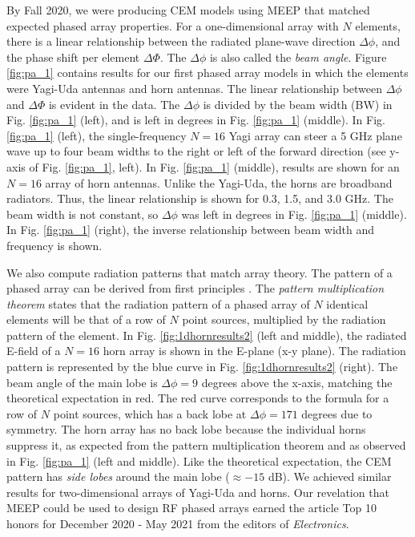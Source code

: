 \documentclass[11pt]{amsart}
\begin{document}
By Fall 2020, we were producing CEM models using MEEP that matched expected phased array properties.  For a one-dimensional array with $N$ elements, there is a linear relationship between the radiated plane-wave direction $\Delta \phi$, and the phase shift per element $\Delta \Phi$.  The $\Delta \phi$ is also called the \textit{beam angle}.  Figure \ref{fig:pa_1} contains results for our first phased array models in which the elements were Yagi-Uda antennas and horn antennas.  The linear relationship between $\Delta \phi$ and $\Delta \Phi$ is evident in the data.  The $\Delta \phi$ is divided by the beam width (BW) in Fig. \ref{fig:pa_1} (left), and is left in degrees in Fig. \ref{fig:pa_1} (middle).  In Fig. \ref{fig:pa_1} (left), the single-frequency $N=16$ Yagi array can steer a 5 GHz plane wave up to four beam widths to the right or left of the forward direction (see y-axis of Fig. \ref{fig:pa_1}, left).  In Fig. \ref{fig:pa_1} (middle), results are shown for an $N=16$ array of horn antennas.  Unlike the Yagi-Uda, the horns are broadband radiators.  Thus, the linear relationship is shown for 0.3, 1.5, and 3.0 GHz.  The beam width is not constant, so $\Delta \phi$ was left in degrees in Fig. \ref{fig:pa_1} (middle).  In Fig. \ref{fig:pa_1} (right), the inverse relationship between beam width and frequency is shown. 

We also compute radiation patterns that match array theory.  The pattern of a phased array can be derived from first principles \cite{electronics10040415}.  The \textit{pattern multiplication theorem} states that the radiation pattern of a phased array of $N$ identical elements will be that of a row of $N$ point sources, multiplied by the radiation pattern of the element.  In Fig. \ref{fig:1dhornresults2} (left and middle), the radiated E-field of a $N=16$ horn array is shown in the E-plane (x-y plane).  The radiation pattern is represented by the blue curve in Fig. \ref{fig:1dhornresults2} (right).  The beam angle of the main lobe is $\Delta \phi = 9$ degrees above the x-axis, matching the theoretical expectation in red.  The red curve corresponds to the formula for a row of $N$ point sources, which has a back lobe at $\Delta \phi = 171$ degrees due to symmetry.  The horn array has no back lobe because the individual horns suppress it, as expected from the pattern multiplication theorem and as observed in Fig. \ref{fig:pa_1} (left and middle).  Like the theoretical expectation, the CEM pattern has \textit{side lobes} around the main lobe ($\approx -15$ dB).  We achieved similar results for two-dimensional arrays of Yagi-Uda and horns.  Our revelation that MEEP could be used to design RF phased arrays earned the article Top 10 honors for December 2020 - May 2021 from the editors of \textit{Electronics}. 
\end{document}
